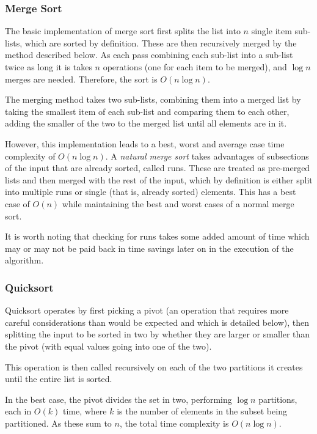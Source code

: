 \documentclass[]{article}
\begin{document}
\subsubsection{Merge Sort}

The basic implementation of merge sort first splits the list into $n$ single item sub-lists, which are sorted by definition. These are then recursively merged by the method described below. As each pass combining each sub-list into a sub-list twice as long it is takes $n$ operations (one for each item to be merged), and $\log{n}$ merges are needed. Therefore, the sort is $O(n\log{n}) $.

The merging method takes two sub-lists, combining them into a merged list by taking the smallest item of each sub-list and comparing them to each other, adding the smaller of the two to the merged list until all elements are in it.

However, this implementation leads to a best, worst and average case time complexity of $O(n\log{n})$. A \emph{natural merge sort} takes advantages of subsections of the input that are already sorted, called runs. These are treated as pre-merged lists and then merged with the rest of the input, which by definition is either split into multiple runs or single (that is, already sorted) elements. This has a best case of $O(n)$ while maintaining the best and worst cases of a normal merge sort.

It is worth noting that checking for runs takes some added amount of time which may or may not be paid back in time savings later on in the execution of the algorithm.

\subsubsection{Quicksort}

Quicksort operates by first picking a pivot (an operation that requires more careful considerations than would be expected and which is detailed below), then splitting the input to be sorted in two by whether they are larger or smaller than the pivot (with equal values going into one of the two).

This operation is then called recursively on each of the two partitions it creates until the entire list is sorted.

In the best case, the pivot divides the set in two, performing $\log{n}$ partitions, each in $O(k)$ time, where $k$ is the number of elements in the subset being partitioned. As these sum to $n$, the total time complexity is $O(n\log{n})$.
\end{document}

